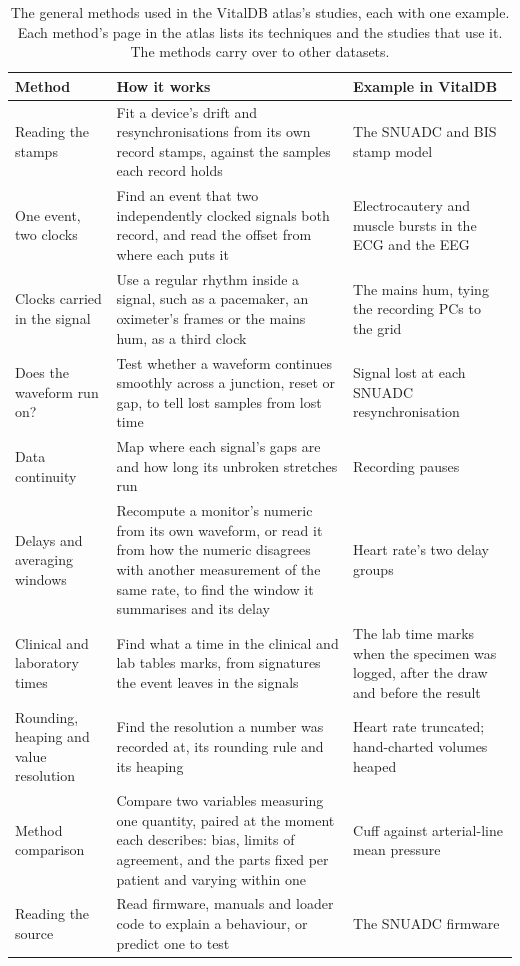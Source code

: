 \documentclass[11pt,a4paper]{article}
\begin{document}
\begin{table}[tp]
  \centering
  \small
  \caption{The general methods used in the VitalDB atlas's studies, each with one example. Each method's page in the
    atlas lists its techniques and the studies that use it. The methods carry over to other datasets.}
  \label{tab:methods}
  \begin{tabularx}{\textwidth}{@{}P{0.2\textwidth}LP{0.27\textwidth}@{}}
    \toprule
    Method & How it works & Example in VitalDB \\
    \midrule
    Reading the stamps & Fit a device's drift and resynchronisations from its own record stamps, against the samples each
      record holds & The SNUADC and BIS stamp model \\
    One event, two clocks & Find an event that two independently clocked signals both record, and read the offset
      from where each puts it & Electrocautery and muscle bursts in the ECG and the EEG \\
    Clocks carried in the signal & Use a regular rhythm inside a signal, such as a pacemaker, an oximeter's frames or
      the mains hum, as a third clock & The mains hum, tying the recording PCs to the grid \\
    Does the waveform run on? & Test whether a waveform continues smoothly across a junction, reset or gap, to tell
      lost samples from lost time & Signal lost at each SNUADC resynchronisation \\
    Data continuity & Map where each signal's gaps are and how long its unbroken stretches run & Recording pauses \\
    Delays and averaging windows & Recompute a monitor's numeric from its own waveform, or read it from how the
      numeric disagrees with another measurement of the same rate, to find the window it summarises and its delay & Heart rate's two delay groups \\
    Clinical and laboratory times & Find what a time in the clinical and lab tables marks, from signatures the event
      leaves in the signals & The lab time marks when the specimen was logged, after the draw and before the result \\
    Rounding, heaping and value resolution & Find the resolution a number was recorded at, its rounding rule and its
      heaping & Heart rate truncated; hand-charted volumes heaped \\
    Method comparison & Compare two variables measuring one quantity, paired at the moment each describes: bias,
      limits of agreement, and the parts fixed per patient and varying within one & Cuff against arterial-line mean
      pressure \\
    Reading the source & Read firmware, manuals and loader code to explain a behaviour, or predict one to test & The
      SNUADC firmware \\
    \bottomrule
  \end{tabularx}
\end{table}
\end{document}
